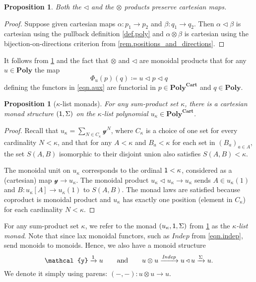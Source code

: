\documentclass[11pt, one side, article]{memoir}
\theoremstyle{definition}
\theoremstyle{plain}
\newtheorem{proposition}[definitionx]{Proposition}
\newenvironment{definition}
  {\pushQED{\qed}\renewcommand{\qedsymbol}{$\lozenge$}\definitionx}
  {\popQED\enddefinitionx}
\newcommand{\Cat}[1]{\mathbf{#1}}%
\newcommand{\Fun}[1]{\mathit{#1}}%
\newcommand{\To}[2][]{\xrightarrow[#1]{#2}}
\newcommand{\yon}{\mathcal{y}}
\newcommand{\poly}{\Cat{Poly}}
\newcommand{\polycart}{\poly^{\Cat{Cart}}}
\newcommand{\0}{\textsf{0}}
\newcommand{\1}{\tn{\textsf{1}}}
\newcommand{\tri}{\mathbin{\triangleleft}}
\newcommand{\indep}{\Fun{Indep}}
\newcommand{\qqand}{\qquad\text{and}\qquad}
\begin{document}
\begin{proposition}\label{prop.tri_dir_cartesian}
Both the $\tri$ and the $\otimes$ products preserve cartesian maps.
\end{proposition}
\begin{proof}
Suppose given cartesian maps $\alpha\colon p_1\to p_2$ and $\beta\colon q_1\to q_2$. Then $\alpha\tri\beta$ is cartesian using the pullback definition \cref{def.poly} and $\alpha\otimes\beta$ is cartesian using the bijection-on-directions criterion from \cref{rem.positions_and_directions}.
\end{proof}

It follows from \cref{prop.tri_dir_cartesian} and the fact that $\otimes$ and $\tri$ are monoidal products that for any $u\in\poly$ the map
\[
	\Phi_u(p)(q)\coloneqq u\tri p\tri q
\]
defining the functors in \eqref{eqn.aux} are functorial in $p\in\polycart$ and $q\in\poly$.

\begin{proposition}[$\kappa$-list monads]\label{prop.list_monad}
For any sum-product set $\kappa$, there is a cartesian monad structure $(\1,\Sigma)$ on the $\kappa$-list polynomial $u_\kappa\in\polycart$.
\end{proposition}
\begin{proof}
Recall that $u_\kappa=\sum_{N\in C_\kappa}\yon^N$, where $C_\kappa$ is a choice of one set for every cardinality $N<\kappa$, and that for any $A<\kappa$ and $B_a<\kappa$ for each set in $(B_a)_{a\in A}$, the set $S(A,B)$ isomorphic to their disjoint union also satisfies $S(A,B)<\kappa$. 

The monoidal unit on $u_\kappa$ corresponds to the ordinal $\1<\kappa$, considered as a (cartesian) map $\yon\to u_\kappa$. The monoidal product $u_\kappa\tri u_\kappa\to u_\kappa$ sends $A\in u_\kappa(1)$ and $B\colon u_\kappa[A]\to u_\kappa(1)$ to $S(A,B)$. The monad laws are satisfied because coproduct is monoidal product and $u_\kappa$ has exactly one position (element in $C_\kappa$) for each cardinality $N<\kappa$. 
\end{proof}

\begin{definition}[$\kappa$-list monads]
For any sum-product set $\kappa$, we refer to the monad $(u_\kappa,\1,\Sigma)$ from \cref{prop.list_monad} as the \emph{$\kappa$-list monad}. Note that since lax monoidal functors, such as $\indep$ from \eqref{eqn.indep}, send monoids to monoids. Hence, we also have a monoid structure 
\begin{equation}\label{eqn.otimes_monoid}
	\yon\To{\1} u
	\qqand
	u\otimes u\To{\indep} u\tri u\To{\Sigma}u.
\end{equation}
We denote it simply using parens: $(-,-)\colon u\otimes u\to u$.
\end{definition}
\end{document}
